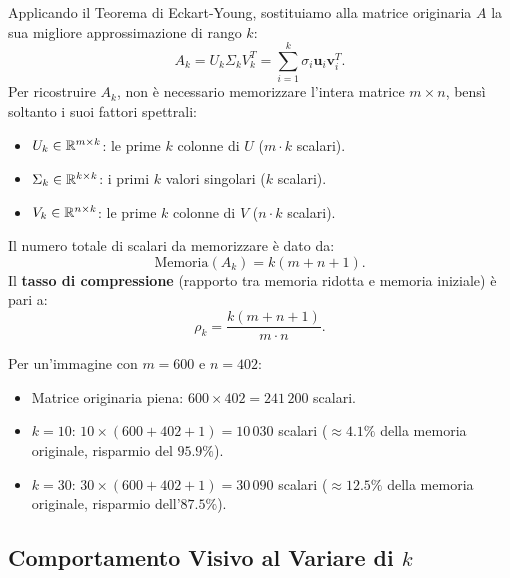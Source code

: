 Applicando il Teorema di Eckart-Young, sostituiamo alla matrice originaria $A$ la sua migliore approssimazione di rango $k$:
\begin{equation}
    A_k = U_k \Sigma_k V_k^T = \sum_{i=1}^k \sigma_i \mathbf{u}_i \mathbf{v}_i^T.
\end{equation}
Per ricostruire $A_k$, non \`e necessario memorizzare l'intera matrice $m \times n$, bens\`i soltanto i suoi fattori spettrali:
\begin{itemize}
    \item $U_k \in \mathbb{R}^{m \times k}$: le prime $k$ colonne di $U$ ($m \cdot k$ scalari).
    \item $\Sigma_k \in \mathbb{R}^{k \times k}$: i primi $k$ valori singolari ($k$ scalari).
    \item $V_k \in \mathbb{R}^{n \times k}$: le prime $k$ colonne di $V$ ($n \cdot k$ scalari).
\end{itemize}
Il numero totale di scalari da memorizzare \`e dato da:
\begin{equation}
    \text{Memoria}(A_k) = k(m + n + 1).
\end{equation}
Il \textbf{tasso di compressione} (rapporto tra memoria ridotta e memoria iniziale) \`e pari a:
\begin{equation}
    \rho_k = \frac{k(m + n + 1)}{m \cdot n}.
\end{equation}

\begin{example}
Per un'immagine con $m = 600$ e $n = 402$:
\begin{itemize}
    \item Matrice originaria piena: $600 \times 402 = 241\,200$ scalari.
    \item $k = 10$: $10 \times (600 + 402 + 1) = 10\,030$ scalari ($\approx 4.1\%$ della memoria originale, risparmio del $95.9\%$).
    \item $k = 30$: $30 \times (600 + 402 + 1) = 30\,090$ scalari ($\approx 12.5\%$ della memoria originale, risparmio dell'$87.5\%$).
\end{itemize}
\end{example}

\subsection{Comportamento Visivo al Variare di $k$}

